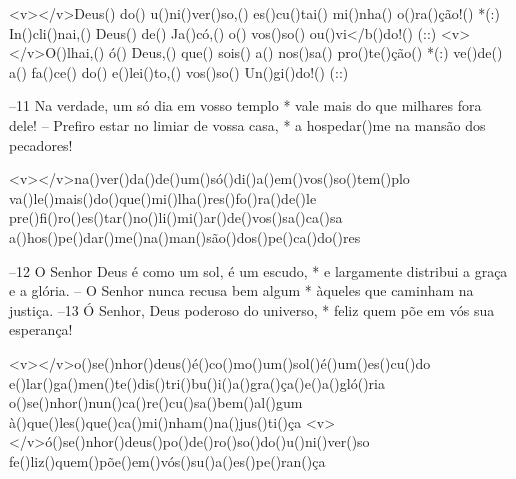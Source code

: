 <v></v>Deus() do() u()ni()ver()so,() es()cu()tai() mi()nha() o()ra()ção!() *(:)
In()cli()nai,() Deus() de() Ja()có,() o() vos()so() ou()vi</b()do!() (::)
<v></v>O()lhai,() ó() Deus,() que() sois() a() nos()sa() pro()te()ção() *(:)
ve()de() a() fa()ce() do() e()lei()to,() vos()so() Un()gi()do!() (::)

–11 Na verdade, um só dia em vosso templo *
vale mais do que milhares fora dele!
– Prefiro estar no limiar de vossa casa, *
a hospedar()me na mansão dos pecadores!

<v></v>na()ver()da()de()um()só()di()a()em()vos()so()tem()plo
va()le()mais()do()que()mi()lha()res()fo()ra()de()le
pre()fi()ro()es()tar()no()li()mi()ar()de()vos()sa()ca()sa
a()hos()pe()dar()me()na()man()são()dos()pe()ca()do()res


–12 O Senhor Deus é como um sol, é um escudo, *
e largamente distribui a graça e a glória.
– O Senhor nunca recusa bem algum *
àqueles que caminham na justiça.
–13 Ó Senhor, Deus poderoso do universo, *
feliz quem põe em vós sua esperança!

<v></v>o()se()nhor()deus()é()co()mo()um()sol()é()um()es()cu()do
e()lar()ga()men()te()dis()tri()bu()i()a()gra()ça()e()a()gló()ria
o()se()nhor()nun()ca()re()cu()sa()bem()al()gum
à()que()les()que()ca()mi()nham()na()jus()ti()ça
<v></v>ó()se()nhor()deus()po()de()ro()so()do()u()ni()ver()so
fe()liz()quem()põe()em()vós()su()a()es()pe()ran()ça